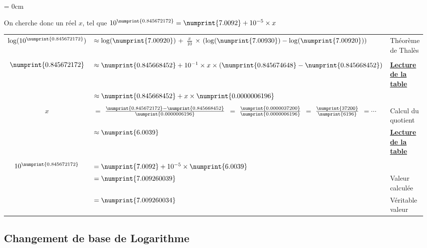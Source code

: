 \documentclass[a4paper]{article}
\begin{document}
{\parindent = 0cm

On cherche donc un réel $x$, tel que $10^{\numprint{0.845 672 172}} = \numprint{7.0092} + 10^{-5} \times x$

\vspace{3 mm}

\begin{small}
\begin{tabular}{cl|l}
$\log (10^{\numprint{0.845 672 172}}) $ & $\approx \log ( \numprint{7.00920} ) ~ + $ {\large$\frac{x}{10}$} $ \times ~ ( \log ( \numprint{7.00930} ) - \log ( \numprint{7.00920} ) )$ & Théorème de Thalès\\

&& \\

$\numprint{0.845 672 172}$	 & $\approx \numprint{0.845 668 452} + 10^{-1} \times x \times (\numprint{0.845 674 648} - \numprint{0.845 668 452} )$ & \underline{\textbf{Lecture de la table}}\\

							 & $\approx \numprint{0.845 668 452} + x \times \numprint{0.000 000 619 6}$ & \\
							 
&& \\

$x$&$=$ {\normalsize$\frac{\numprint{0.845 672 172} -  \numprint{0.845 668 452}} {\numprint{0.000 000 619 6}} $} $=$ {\normalsize$\frac{\numprint{0.000 003 720 0}} {\numprint{0.000 000 619 6}} $} $=$ {\normalsize$\frac{\numprint{3 7200}} {\numprint{619 6}} $} $= \cdots$  & Calcul du quotient \\
							 
							 & $\approx \numprint{6.0039}$ & \underline{\textbf{Lecture de la table}}\\
							 
&& \\
							 
$10^{\numprint{0.845 672 172}}$ & $= \numprint{7.0092} + 10^{-5} \times \numprint{6.0039}$ & \\
								& $= \numprint{7.009 260 039}$ & Valeur calculée\\
								& $= \numprint{7.009 260 034}$ & Véritable valeur\\
\end{tabular}
\end{small}

}

\pagebreak

\subsection{Changement de base de Logarithme}
\end{document}
